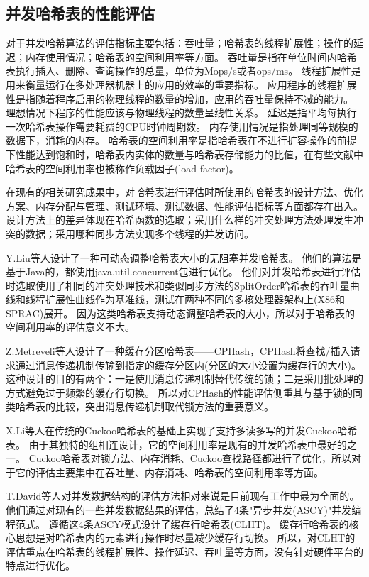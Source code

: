 \subsection{并发哈希表的性能评估}
 
对于并发哈希算法的评估指标主要包括：吞吐量；哈希表的线程扩展性；操作的延迟；内存使用情况；哈希表的空间利用率等方面。
吞吐量是指在单位时间内哈希表执行插入、删除、查询操作的总量，单位为Mops/s或者ops/ms。
线程扩展性是用来衡量运行在多处理器机器上的应用的效率的重要指标。
应用程序的线程扩展性是指随着程序启用的物理线程的数量的增加，应用的吞吐量保持不减的能力。
理想情况下程序的性能应该与物理线程的数量呈线性关系。
延迟是指平均每执行一次哈希表操作需要耗费的CPU时钟周期数。
内存使用情况是指处理同等规模的数据下，消耗的内存。
哈希表的空间利用率是指哈希表在不进行扩容操作的前提下性能达到饱和时，哈希表内实体的数量与哈希表存储能力的比值，在有些文献中哈希表的空间利用率也被称作负载因子(load factor)。

在现有的相关研究成果中\cite{clht,cuckoo,hopscotch,metreveli2012cphash,nonblocking,nonblocking}，对哈希表进行评估时所使用的哈希表的设计方法、优化方案、内存分配与管理、测试环境、测试数据、性能评估指标等方面都存在出入。
设计方法上的差异体现在哈希函数的选取；采用什么样的冲突处理方法处理发生冲突的数据；采用哪种同步方法实现多个线程的并发访问。

Y.Liu等人设计了一种可动态调整哈希表大小的无阻塞并发哈希表\cite{nonblocking}。
他们的算法是基于Java的，都使用java.util.concurrent包进行优化。
他们对并发哈希表进行评估时选取使用了相同的冲突处理技术和类似同步方法的SplitOrder哈希表\cite{shalev2006split}的吞吐量曲线和线程扩展性曲线作为基准线，测试在两种不同的多核处理器架构上(X86和SPRAC)展开。
因为这类哈希表支持动态调整哈希表的大小，所以对于哈希表的空间利用率的评估意义不大。

Z.Metreveli等人设计了一种缓存分区哈希表——CPHash\cite{metreveli2012cphash}，CPHash将查找/插入请求通过消息传递机制传输到指定的缓存分区内(分区的大小设置为缓存行的大小)。这种设计的目的有两个：一是使用消息传递机制替代传统的锁；二是采用批处理的方式避免过于频繁的缓存行切换。
所以对CPHash的性能评估侧重其与基于锁的同类哈希表的比较，突出消息传递机制取代锁方法的重要意义。

X.Li等人在传统的Cuckoo哈希表的基础上实现了支持多读多写的并发Cuckoo哈希表\cite{cuckoo}。
由于其独特的组相连设计，它的空间利用率是现有的并发哈希表中最好的之一。
Cuckoo哈希表对锁方法、内存消耗、Cuckoo查找路径都进行了优化，所以对于它的评估主要集中在吞吐量、内存消耗、哈希表的空间利用率等方面。

T.David等人对并发数据结构的评估方法相对来说是目前现有工作中最为全面的\cite{clht}。
他们通过对现有的一些并发数据结果的评估，总结了4条"异步并发(ASCY)"并发编程范式。
遵循这4条ASCY模式设计了缓存行哈希表(CLHT)。
缓存行哈希表的核心思想是对哈希表内的元素进行操作时尽量减少缓存行切换。
所以，对CLHT的评估重点在哈希表的线程扩展性、操作延迟、吞吐量等方面，没有针对硬件平台的特点进行优化。

